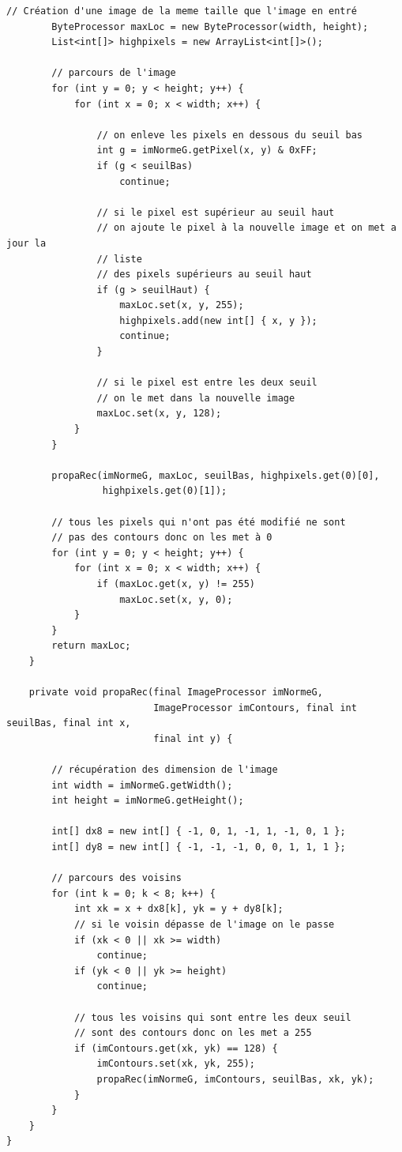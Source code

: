 \documentclass[a4paper,11pt]{article}
\begin{document}
\begin{lstlisting}[caption=Plugin pour le seuillage des maxima locaux par hystérésis]
        // Création d'une image de la meme taille que l'image en entré
        ByteProcessor maxLoc = new ByteProcessor(width, height);
        List<int[]> highpixels = new ArrayList<int[]>();

        // parcours de l'image
        for (int y = 0; y < height; y++) {
            for (int x = 0; x < width; x++) {

                // on enleve les pixels en dessous du seuil bas
                int g = imNormeG.getPixel(x, y) & 0xFF;
                if (g < seuilBas)
                    continue;

                // si le pixel est supérieur au seuil haut
                // on ajoute le pixel à la nouvelle image et on met a jour la
                // liste
                // des pixels supérieurs au seuil haut
                if (g > seuilHaut) {
                    maxLoc.set(x, y, 255);
                    highpixels.add(new int[] { x, y });
                    continue;
                }

                // si le pixel est entre les deux seuil
                // on le met dans la nouvelle image
                maxLoc.set(x, y, 128);
            }
        }

        propaRec(imNormeG, maxLoc, seuilBas, highpixels.get(0)[0],
                 highpixels.get(0)[1]);

        // tous les pixels qui n'ont pas été modifié ne sont
        // pas des contours donc on les met à 0
        for (int y = 0; y < height; y++) {
            for (int x = 0; x < width; x++) {
                if (maxLoc.get(x, y) != 255)
                    maxLoc.set(x, y, 0);
            }
        }
        return maxLoc;
    }

    private void propaRec(final ImageProcessor imNormeG,
                          ImageProcessor imContours, final int seuilBas, final int x,
                          final int y) {

        // récupération des dimension de l'image
        int width = imNormeG.getWidth();
        int height = imNormeG.getHeight();

        int[] dx8 = new int[] { -1, 0, 1, -1, 1, -1, 0, 1 };
        int[] dy8 = new int[] { -1, -1, -1, 0, 0, 1, 1, 1 };

        // parcours des voisins
        for (int k = 0; k < 8; k++) {
            int xk = x + dx8[k], yk = y + dy8[k];
            // si le voisin dépasse de l'image on le passe
            if (xk < 0 || xk >= width)
                continue;
            if (yk < 0 || yk >= height)
                continue;

            // tous les voisins qui sont entre les deux seuil
            // sont des contours donc on les met a 255
            if (imContours.get(xk, yk) == 128) {
                imContours.set(xk, yk, 255);
                propaRec(imNormeG, imContours, seuilBas, xk, yk);
            }
        }
    }
}

\end{lstlisting}

  
\end{document}

